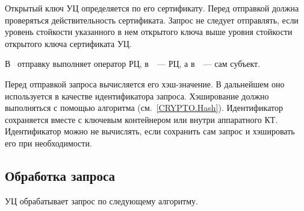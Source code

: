 Открытый ключ УЦ определяется по его сертификату. Перед отправкой должна
проверяться действительность сертификата.
%
Запрос не следует отправлять, если уровень стойкости указанного в нем открытого
ключа выше уровня стойкости открытого ключа сертификата УЦ.

В~ отправку выполняет оператор РЦ, в~~--- РЦ, а
в~~--- сам субъект.

Перед отправкой запроса вычисляется его хэш-значение. В дальнейшем оно
используется в качестве идентификатора запроса. Хэширование должно выполняться с
помощью алгоритма  (см.~\ref{CRYPTO.Hash}).
%
Идентификатор сохраняется вместе с ключевым контейнером или внутри аппаратного
КТ.
%
Идентификатор можно не вычислять, если сохранить сам запрос и хэшировать его при
необходимости.

\subsection{Обработка запроса}\label{PROCESSES.Enroll.Issue}

УЦ обрабатывает запрос по следующему алгоритму.

